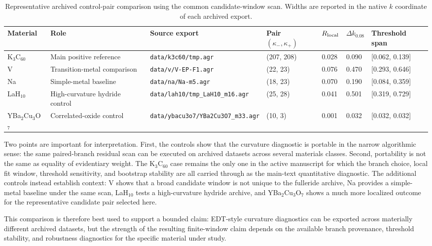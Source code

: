﻿\documentclass[aps,prx,reprint,superscriptaddress,longbibliography,floatfix]{revtex4-2}
\begin{document}
\begin{table}[t]
\centering
\caption{Representative archived control-pair comparison using the common candidate-window scan. Widths are reported in the native $k$ coordinate of each archived export.}
\begin{tabular}{lllllll}
\hline
Material & Role & Source export & Pair $(\kappa_-,\kappa_+)$ & $R_{\rm local}$ & $\Delta k_{0.08}$ & Threshold span \\
\hline
K$_3$C$_{60}$ & Main positive reference & \texttt{data/k3c60/tmp.agr} & (207, 208) & 0.028 & 0.090 & [0.062, 0.139] \\
V & Transition-metal comparison & \texttt{data/v/V-EP-F1.agr} & (22, 23) & 0.076 & 0.470 & [0.293, 0.646] \\
Na & Simple-metal baseline & \texttt{data/na/Na-m5.agr} & (18, 23) & 0.070 & 0.190 & [0.084, 0.359] \\
LaH$_{10}$ & High-curvature hydride control & \texttt{data/lah10/tmp\_LaH10\_m16.agr} & (25, 28) & 0.041 & 0.501 & [0.319, 0.729] \\
YBa$_2$Cu$_3$O$_7$ & Correlated-oxide control & \texttt{data/ybacu3o7/YBa2Cu3O7\_m33.agr} & (10, 3) & 0.001 & 0.032 & [0.032, 0.032] \\
\hline
\end{tabular}
\label{tab:s4_material_controls}
\end{table}

Two points are important for interpretation. First, the controls show that the curvature diagnostic is portable in the narrow algorithmic sense: the same paired-branch residual scan can be executed on archived datasets across several materials classes. Second, portability is not the same as equality of evidentiary weight. The K$_3$C$_{60}$ case remains the only one in the active manuscript for which the branch choice, local fit window, threshold sensitivity, and bootstrap stability are all carried through as the main-text quantitative diagnostic. The additional controls instead establish context: V shows that a broad candidate window is not unique to the fulleride archive, Na provides a simple-metal baseline under the same scan, LaH$_{10}$ tests a high-curvature hydride archive, and YBa$_2$Cu$_3$O$_7$ shows a much more localized outcome for the representative candidate pair selected here.

This comparison is therefore best used to support a bounded claim: EDT-style curvature diagnostics can be exported across materially different archived datasets, but the strength of the resulting finite-window claim depends on the available branch provenance, threshold stability, and robustness diagnostics for the specific material under study.
\end{document}
